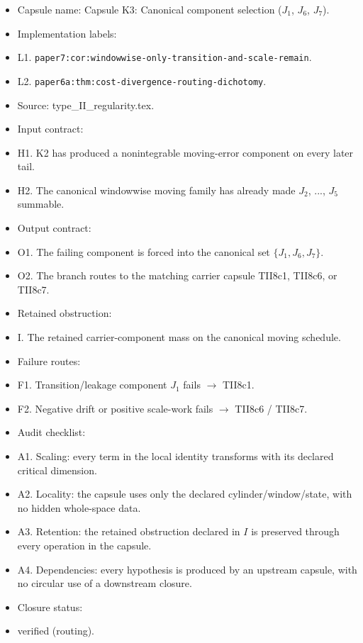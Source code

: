 \documentclass[11pt]{amsart}
\begin{document}
\begin{itemize}
  \item Capsule name: Capsule K3: Canonical component selection ($J_1$, $J_6$, $J_7$).
  \item Implementation labels:
  \item L1. \texttt{paper7:cor:windowwise-only-transition-and-scale-remain}.
  \item L2. \texttt{paper6a:thm:cost-divergence-routing-dichotomy}.
  \item Source: type\_II\_regularity.tex.
  \item Input contract:
  \item H1. K2 has produced a nonintegrable moving-error component on every later tail.
  \item H2. The canonical windowwise moving family has already made $J_2$, ..., $J_5$ summable.
  \item Output contract:
  \item O1. The failing component is forced into the canonical set $\{J_1,J_6,J_7\}$.
  \item O2. The branch routes to the matching carrier capsule TII8c1, TII8c6, or TII8c7.
  \item Retained obstruction:
  \item I. The retained carrier-component mass on the canonical moving schedule.
  \item Failure routes:
  \item F1. Transition/leakage component $J_1$ fails $\to$ TII8c1.
  \item F2. Negative drift or positive scale-work fails $\to$ TII8c6 / TII8c7.
  \item Audit checklist:
  \item A1. Scaling: every term in the local identity transforms with its declared critical dimension.
  \item A2. Locality: the capsule uses only the declared cylinder/window/state, with no hidden whole-space data.
  \item A3. Retention: the retained obstruction declared in $I$ is preserved through every operation in the capsule.
  \item A4. Dependencies: every hypothesis is produced by an upstream capsule, with no circular use of a downstream closure.
  \item Closure status:
  \item verified (routing).
\end{itemize}
\end{document}

